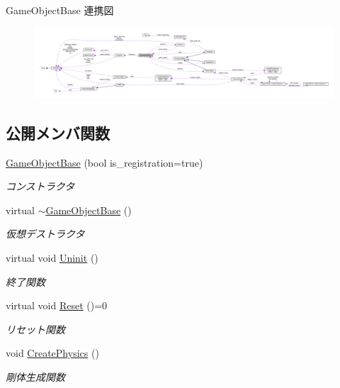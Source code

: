 Game\+Object\+Base 連携図\nopagebreak
\begin{figure}[H]
\begin{center}
\leavevmode
\includegraphics[width=350pt]{class_game_object_base__coll__graph}
\end{center}
\end{figure}
\subsection*{公開メンバ関数}
\begin{DoxyCompactItemize}
\item 
\mbox{\hyperlink{class_game_object_base_a4682a3e88a45a462de288f14e9a8545d}{Game\+Object\+Base}} (bool is\+\_\+registration=true)
\begin{DoxyCompactList}\small\item\em コンストラクタ \end{DoxyCompactList}\item 
virtual \mbox{\hyperlink{class_game_object_base_a0cb813d5c7af673a3d190eb1b2d26275}{$\sim$\+Game\+Object\+Base}} ()
\begin{DoxyCompactList}\small\item\em 仮想デストラクタ \end{DoxyCompactList}\item 
virtual void \mbox{\hyperlink{class_game_object_base_a97e1bc277d7b1c0156d4735de29a022c}{Uninit}} ()
\begin{DoxyCompactList}\small\item\em 終了関数 \end{DoxyCompactList}\item 
virtual void \mbox{\hyperlink{class_game_object_base_a85c59554f734bcb09f1a1e18d9517dce}{Reset}} ()=0
\begin{DoxyCompactList}\small\item\em リセット関数 \end{DoxyCompactList}\item 
void \mbox{\hyperlink{class_game_object_base_adf7df49baa04363c63f9515317776e40}{Create\+Physics}} ()
\begin{DoxyCompactList}\small\item\em 剛体生成関数 \end{DoxyCompactList}\item 

\end{DoxyCompactItemize}
